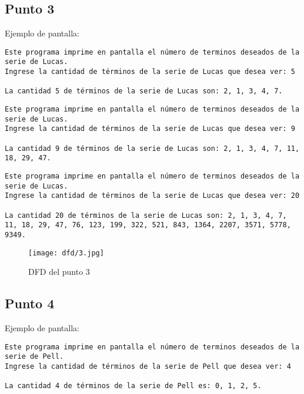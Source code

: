 

\subsection{Punto 3}
	
	Ejemplo de pantalla:
\begin{lstlisting}
Este programa imprime en pantalla el número de terminos deseados de la serie de Lucas.
Ingrese la cantidad de términos de la serie de Lucas que desea ver: 5

La cantidad 5 de términos de la serie de Lucas son: 2, 1, 3, 4, 7.
\end{lstlisting}

\begin{lstlisting}
Este programa imprime en pantalla el número de terminos deseados de la serie de Lucas.
Ingrese la cantidad de términos de la serie de Lucas que desea ver: 9

La cantidad 9 de términos de la serie de Lucas son: 2, 1, 3, 4, 7, 11, 18, 29, 47.
\end{lstlisting}

\begin{lstlisting}
Este programa imprime en pantalla el número de terminos deseados de la serie de Lucas.
Ingrese la cantidad de términos de la serie de Lucas que desea ver: 20

La cantidad 20 de términos de la serie de Lucas son: 2, 1, 3, 4, 7, 11, 18, 29, 47, 76, 123, 199, 322, 521, 843, 1364, 2207, 3571, 5778, 9349.
\end{lstlisting}

\begin{figure}
  \centering
  \texttt{[image: dfd/3.jpg]}
  \caption{ DFD del punto 3}
  \label{fig: DFD del punto 3}
\end{figure}





\subsection{Punto 4}
	
	Ejemplo de pantalla:
\begin{lstlisting}
Este programa imprime en pantalla el número de terminos deseados de la serie de Pell.
Ingrese la cantidad de términos de la serie de Pell que desea ver: 4

La cantidad 4 de términos de la serie de Pell es: 0, 1, 2, 5.
\end{lstlisting}

